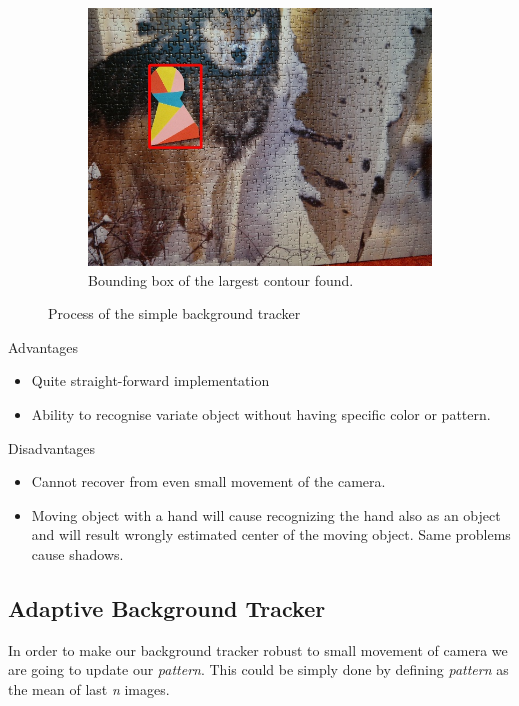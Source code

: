 \begin{figure}
\begin{subfigure}[b]{0.48\linewidth}
    \includegraphics[width=\linewidth]{img/simple_background/result.jpg}
    \caption{Bounding box of the largest contour found.}
  \end{subfigure}
  \caption{Process of the simple background tracker}
  \label{fig:simple-background-tracker}
\end{figure}

Advantages
\begin{itemize}
\item Quite straight-forward implementation
\item Ability to recognise variate object without having specific color or pattern.
\end{itemize}

Disadvantages
\begin{itemize}
\item Cannot recover from even small movement of the camera.
\item Moving object with a hand will cause recognizing the hand also as an object and will result wrongly estimated center of the moving object. Same problems cause shadows.
\end{itemize}

\subsection{Adaptive Background Tracker}

In order to make our background tracker robust to small movement of camera we
are going to update our \emph{pattern}. This could be simply done by defining \emph{pattern}
as the mean of last \emph{n} images.

